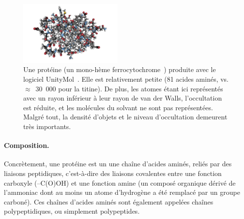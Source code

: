 	\begin{figure} %
		\centering
		\includegraphics[width=0.46\textwidth]{figures/ch1/1KX2}
		\caption[Une protéine en \emph{Hyperballs}]{Une protéine (un mono-hème ferrocytochrome~\cite{bartalesi2002solution}) produite avec le logiciel UnityMol~\cite{doutreligne2014unitymol}. Elle est relativement petite (81 acides aminés, vs. $\approx$~30~000 pour la titine). De plus, les atomes étant ici représentés avec un rayon inférieur à leur rayon de van der Walls, l'occultation est réduite, et les molécules du solvant ne sont pas représentées. Malgré tout, la densité d'objets et le niveau d'occultation demeurent très importants.}
		\label{fig:1KX2}
	\end{figure}
	
	\paragraph{Composition.}
	Concrètement, une protéine est un une  chaîne d'acides aminés, reliés par des liaisons peptidiques, c'est-à-dire des liaisons covalentes entre une fonction carboxyle (–C(O)OH) et une fonction amine (un composé organique dérivé de l'ammoniac dont au moins un atome d'hydrogène a été remplacé par un groupe carboné). Ces chaînes d'acides aminés sont également appelées chaînes polypeptidiques, ou simplement polypeptides.
	
